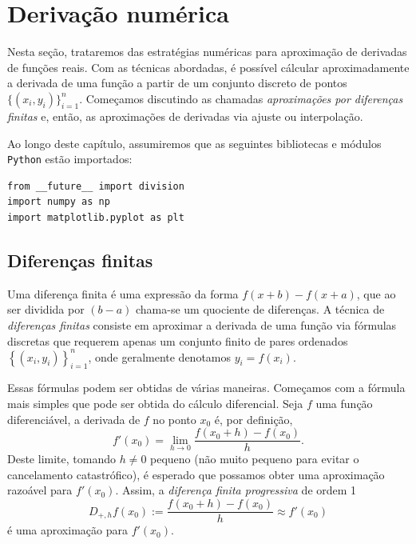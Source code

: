 
\chapter{Derivação numérica}

Nesta seção, trataremos das estratégias numéricas para aproximação de derivadas de funções reais. Com as técnicas abordadas, é possível cálcular aproximadamente a derivada de uma função a partir de um conjunto discreto de pontos $\{(x_i, y_i)\}_{i=1}^n$. Começamos discutindo as chamadas \emph{aproximações por diferenças finitas} e, então, as aproximações de derivadas via ajuste ou interpolação.

\ifispython
Ao longo deste capítulo, assumiremos que as seguintes bibliotecas e módulos \verb+Python+ estão importados:
\begin{verbatim}
from __future__ import division
import numpy as np
import matplotlib.pyplot as plt
\end{verbatim}
\fi

\section{Diferenças finitas}

Uma diferença finita é uma expressão da forma $f(x+b)-f(x+a)$, que ao ser dividida por $(b-a)$ chama-se um quociente de diferenças. A técnica de \emph{diferenças finitas} consiste em aproximar a derivada de uma função via fórmulas discretas que requerem apenas um conjunto finito de pares ordenados $\left\{\left(x_i, y_i\right)\right\}_{i=1}^n$, onde geralmente denotamos $y_i=f(x_i)$.

Essas fórmulas podem ser obtidas de várias maneiras. Começamos com a fórmula mais simples que pode ser obtida do cálculo diferencial. Seja $f$ uma função diferenciável, a derivada de $f$ no ponto $x_0$ é, por definição,
\begin{equation*}
  f'(x_0)=\lim_{h\to 0}\frac{f(x_0+h)-f(x_0)}{h}.
\end{equation*}
Deste limite, tomando $h\neq 0$ pequeno (não muito pequeno para evitar o cancelamento catastrófico), é esperado que possamos obter uma aproximação razoável para $f'(x_0)$. Assim, a \emph{diferença finita progressiva} de ordem 1
\begin{equation}\label{eq:dp}
  D_{+,h}f(x_0) := \frac{f(x_0+h)-f(x_0)}{h} \approx f'(x_0)
\end{equation}
é uma aproximação para $f'(x_0)$.

